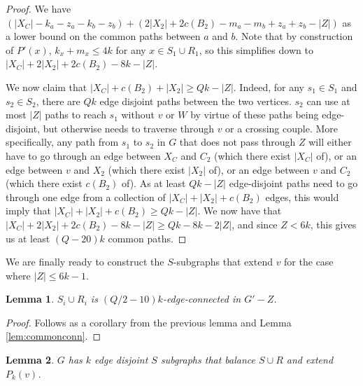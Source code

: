 \documentclass{article}
\newtheorem{lemma}{Lemma}[section]
\begin{document}
\begin{proof}
    We have $(|X_C|-k_a-z_a-k_b-z_b)+(2|X_2|+2c(B_2)-m_a-m_b+z_a+z_b-|Z|)$ as a lower bound on the common paths between $a$ and $b$. Note that by construction of $P'(x)$, $k_x+m_x \leq 4k$ for any $x \in S_1 \cup R_1$, so this simplifies down to $|X_C|+2|X_2|+2c(B_2)-8k-|Z|$. 

    We now claim that $|X_C|+c(B_2)+|X_2| \geq Qk-|Z|$. Indeed, for any $s_1 \in S_1$ and $s_2 \in S_2$, there are $Qk$ edge disjoint paths between the two vertices. $s_2$ can use at most $|Z|$ paths to reach $s_1$ without $v$ or $W$ by virtue of these paths being edge-disjoint, but otherwise needs to traverse through $v$ or a crossing couple. More specifically, any path from $s_1$ to $s_2$ in $G$ that does not pass through $Z$ will either have to go through an edge between $X_C$ and $C_2$ (which there exist $|X_C|$ of), or an edge between $v$ and $X_2$ (which there exist $|X_2|$ of), or an edge between $v$ and $C_2$ (which there exist $c(B_2)$ of). As at least $Qk-|Z|$ edge-disjoint paths need to go through one edge from a collection of $|X_C|+|X_2|+c(B_2)$ edges, this would imply that $|X_C|+|X_2|+c(B_2) \geq Qk-|Z|$. %
    We now have that $|X_C|+2|X_2|+2c(B_2)-8k-|Z| \geq Qk-8k-2|Z|$, and since $Z < 6k$, this gives us at least $(Q-20)k$ common paths. %
\end{proof}


We are finally ready to construct the $S$-subgraphs that extend $v$ for the case where $|Z| \leq 6k-1$. 

\begin{lemma}
    $S_i \cup R_i$ is $(Q/2-10)k$-edge-connected in $G'-Z$. 
\end{lemma}
\begin{proof}
    Follows as a corollary from the previous lemma and Lemma \ref{lem:commonconn}.
\end{proof}

\begin{lemma}\label{lem:case1}
    $G$ has $k$ edge disjoint $S$ subgraphs that balance $S \cup R$ and extend $P_k(v)$. 
\end{lemma}
\end{document}
